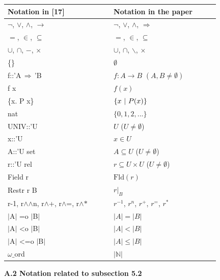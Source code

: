\documentclass[10pt,a4paper]{amsart}
\begin{document}
\begin{longtable}{|p{0.415\linewidth}|p{0.415\linewidth}|}\hline
Notation in [17] & Notation in the paper \\ \hline
$\neg$, $\vee$, $\wedge$, $\longrightarrow$ & $\neg$, $\vee$, $\wedge$, $\Rightarrow$ \\ \hline
$=$, $\in$, $\subseteq$ & $=$, $\in$, $\subseteq$ \\ \hline
$\cup$, $\cap$, $-$, $\times$ & $\cup$, $\cap$, $\backslash$, $\times$ \\ \hline
\{\} & $\emptyset$ \\ \hline
f::’A$\,\Rightarrow\,$’B & $f:A\to B$ $(A,B\neq\emptyset)$ \\ \hline
f x & $f(x)$ \\ \hline
\{x. P x\} & $\{x\leavevmode\nobreak\ |\leavevmode\nobreak\ P(x)\}$ \\ \hline
nat & $\{0,1,2,...\}$ \\ \hline
UNIV::’U & $U$ ($U\neq\emptyset$) \\ \hline
x::’U & $x\in U$ \\ \hline
A::’U set & $A\subseteq U$ ($U\neq\emptyset$) \\ \hline
r::’U rel & $r\subseteq U\times U$ ($U\neq\emptyset$) \\ \hline
Field r & $\mathrm{Fld}(r)$ \\ \hline
Restr r B & $r|_{B}$ \\ \hline
r-1, r\ensuremath{\wedge}\ensuremath{\wedge}n, r\ensuremath{\wedge}+, r\ensuremath{\wedge}=, r\ensuremath{\wedge}\ensuremath{\ast} & $r^{-1}$, $r^{n}$, $r^{+}$, $r^{=}$, $r^{*}$ \\ \hline
$|$A$|$ =o $|$B$|$ & $|A|=|B|$ \\ \hline
$|$A$|$ <o $|$B$|$ & $|A|<|B|$ \\ \hline
$|$A$|$ <=o $|$B$|$ & $|A|\leq|B|$ \\ \hline
$\omega\_$ord & $|\mathbb{N}|$ \\ \hline
\end{longtable}
 
 
 
 
\par\medskip\noindent\textbf{A.2 Notation related to subsection 5.2}\par
 
 
\end{document}
